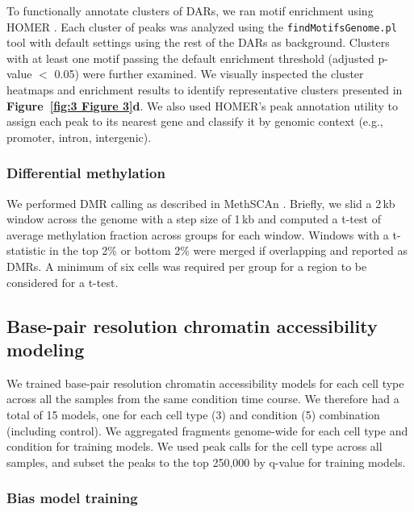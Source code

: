 To functionally annotate clusters of DARs, we ran motif enrichment using HOMER \cite{Heinz2010-yo}. Each cluster of peaks was analyzed using the \texttt{findMotifsGenome.pl} tool with default settings using the rest of the DARs as background. Clusters with at least one motif passing the default enrichment threshold (adjusted p-value $<$ 0.05) were further examined. We visually inspected the cluster heatmaps and enrichment results to identify representative clusters presented in \textbf{Figure~\ref{fig:3 Figure 3}d}. We also used HOMER’s peak annotation utility to assign each peak to its nearest gene and classify it by genomic context (e.g., promoter, intron, intergenic).

\subsubsection{Differential methylation}

We performed DMR calling as described in MethSCAn \cite{Kremer2024-pd}. Briefly, we slid a 2\,kb window across the genome with a step size of 1\,kb and computed a t-test of average methylation fraction across groups for each window. Windows with a t-statistic in the top 2\% or bottom 2\% were merged if overlapping and reported as DMRs. A minimum of six cells was required per group for a region to be considered for a t-test.

\subsection*{Base-pair resolution chromatin accessibility modeling}

We trained base-pair resolution chromatin accessibility models for each cell type across all the samples from the same condition time course. We therefore had a total of 15 models, one for each cell type (3) and condition (5) combination (including control). We aggregated fragments genome-wide for each cell type and condition for training models. We used peak calls for the cell type across all samples, and subset the peaks to the top 250,000 by q-value for training models.

\subsubsection*{Bias model training}

